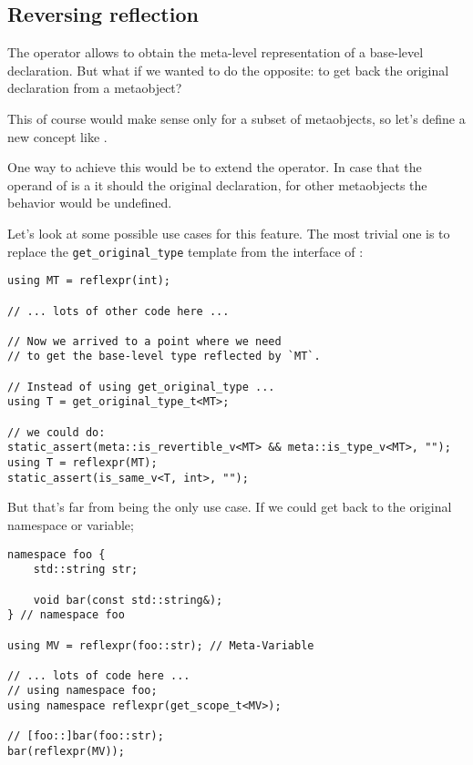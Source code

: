 \subsection{Reversing reflection}
\label{fut-reverse-reflection}

The \verb@reflexpr@ operator allows to obtain the meta-level representation
of a base-level declaration. But what if we wanted to do the opposite: to
get back the original declaration from a metaobject?

This of course would make sense only for a subset of metaobjects, so let's
define a new concept like .

One way to achieve this would be to extend the \verb@reflexpr@
operator. In case that the operand of \verb@reflexpr@ is a 
it should  the original declaration, for other metaobjects the behavior
would be undefined.

Let's look at some possible use cases for this feature.
The most trivial one is to replace the \texttt{get\_original\_type}
template from the interface of :

\begin{verbatim}
using MT = reflexpr(int);

// ... lots of other code here ...

// Now we arrived to a point where we need
// to get the base-level type reflected by `MT`.

// Instead of using get_original_type ...
using T = get_original_type_t<MT>;

// we could do:
static_assert(meta::is_revertible_v<MT> && meta::is_type_v<MT>, "");
using T = reflexpr(MT);
static_assert(is_same_v<T, int>, "");

\end{verbatim}

But that's far from being the only use case. If we could get back to
the original namespace or variable;

\begin{verbatim}
namespace foo {
	std::string str;

	void bar(const std::string&);
} // namespace foo

using MV = reflexpr(foo::str); // Meta-Variable

// ... lots of code here ...
// using namespace foo;
using namespace reflexpr(get_scope_t<MV>);

// [foo::]bar(foo::str);
bar(reflexpr(MV));

\end{verbatim}

